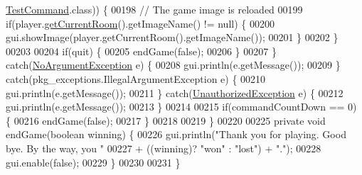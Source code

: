 \begin{DoxyCode}
      \hyperlink{classpkg__commands_1_1TestCommand}{TestCommand}.class)) \{
00198                 \textcolor{comment}{// The game image is reloaded}
00199                 \textcolor{keywordflow}{if}(player.\hyperlink{classpkg__world_1_1Player_a5ff0ede152d97c0c9cf6603c9a422a77}{getCurrentRoom}().getImageName() != null) \{
00200                     gui.showImage(player.getCurrentRoom().getImageName());
00201                 \}
00202             \}
00203 
00204             \textcolor{keywordflow}{if}(quit) \{
00205                 endGame(\textcolor{keyword}{false});
00206             \}
00207         \} \textcolor{keywordflow}{catch}(\hyperlink{classpkg__exceptions_1_1NoArgumentException}{NoArgumentException} e) \{
00208             gui.println(e.getMessage());
00209         \} \textcolor{keywordflow}{catch}(pkg\_exceptions.IllegalArgumentException e) \{
00210             gui.println(e.getMessage());
00211         \} \textcolor{keywordflow}{catch}(\hyperlink{classpkg__exceptions_1_1UnauthorizedException}{UnauthorizedException} e) \{
00212             gui.println(e.getMessage());
00213         \}
00214 
00215         \textcolor{keywordflow}{if}(commandCountDown == 0) \{
00216             endGame(\textcolor{keyword}{false});
00217         \}
00218 
00219     \}
00220 
00225     \textcolor{keyword}{private} \textcolor{keywordtype}{void} endGame(\textcolor{keywordtype}{boolean} winning) \{
00226         gui.println(\textcolor{stringliteral}{"Thank you for playing. Good bye. By the way, you "}
00227                 + ((winning)? \textcolor{stringliteral}{"won"} : \textcolor{stringliteral}{"lost"}) + \textcolor{stringliteral}{"."});
00228         gui.enable(\textcolor{keyword}{false});
00229     \}
00230 
00231 \}
\end{DoxyCode}
